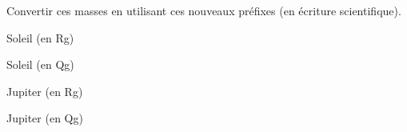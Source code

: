 Convertir ces masses en utilisant ces nouveaux préfixes (en écriture scientifique).




\debutEntrainement


\begin{enonce}
Soleil (en Rg)
\end{enonce}





\begin{enonce}
Soleil (en Qg)
\end{enonce}






\begin{enonce}
Jupiter (en Rg)
\end{enonce}





\begin{enonce}
Jupiter (en Qg)
\end{enonce}

